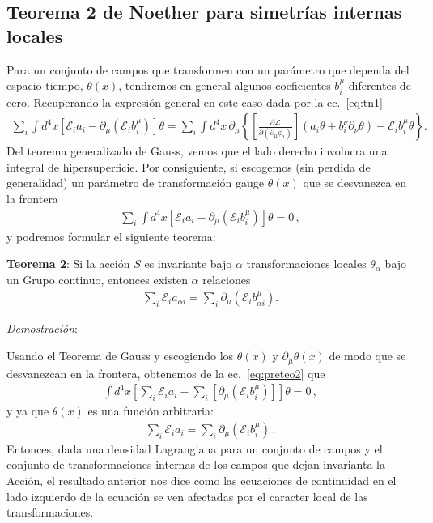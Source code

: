 \subsection{Teorema 2 de Noether para simetrías internas locales}
Para un conjunto de campos que transformen con un parámetro que dependa del espacio tiempo, $\theta(x)$, tendremos en general algunos coeficientes $b_i^{\mu}$ diferentes de cero. Recuperando la expresión general en este caso dada por la ec.~\eqref{eq:tn1}
%
\begin{align}
\sum_i\int {d^4}x \left[ \mathcal{E}_ia_i -  \partial_{\mu}   \left(  \mathcal{E}_i b^{\mu}_i  \right) \right]  \theta   =  \sum_i \int {d^4}x\, \partial_{\mu} \left\{ \left[ \frac{\partial\mathcal{L}}{\partial(\partial_{\mu}\phi_i)}\right] \left( a_i \theta +b^{\nu}_i \partial_{\nu}\theta \right) -\mathcal{E}_i b^{\mu}_i \theta  \right\}.
\end{align}
Del teorema generalizado de Gauss, vemos que el lado derecho involucra una integral de hipersuperficie. 
Por consiguiente, si escogemos (sin perdida de generalidad) un parámetro de transformación gauge $\theta(x)$ que se desvanezca en la frontera
\begin{align}
  \label{eq:preteo2}
\sum_i\int {d^4}x \left[ \mathcal{E}_ia_i -  \partial_{\mu}   \left(  \mathcal{E}_i b^{\mu}_i  \right) \right]  \theta   =0\,,
\end{align}
y podremos formular el siguiente teorema:


\begin{frame}
\textbf{Teorema 2}: Si la acción $S$ es invariante bajo $\alpha$ transformaciones locales $\theta_{\alpha}$ bajo un Grupo  continuo, entonces existen $\alpha$ relaciones
\begin{align}
  \sum_{i}\mathcal{E}_{i} a_{\alpha i}=\sum_{i} \partial_{\mu} \left( \mathcal{E}_{i} b^{\mu}_{\alpha i} \right).
\end{align}
\end{frame}
\emph{Demostración}:

Usando el Teorema de Gauss y escogiendo los $\theta(x)$ y $\partial_{\mu}\theta(x)$ de modo que se desvanezcan en la frontera, obtenemos de la ec.~\eqref{eq:preteo2} que
\begin{align*}
\int {d^4}x \left[    \sum_i  \mathcal{E}_ia_i -\sum_i  \left[ \partial_{\mu}   \left(  \mathcal{E}_i b^{\mu}_i  \right) \right] \right]\theta   =0\,,
\end{align*}
y ya que $\theta(x)$ es una función arbitraria:
\begin{align}
  \sum_i \mathcal{E}_ia_i=\sum_i  \partial_{\mu}   \left(  \mathcal{E}_i b^{\mu}_i  \right) \,.
\end{align}
Entonces, dada una densidad Lagrangiana para un conjunto de campos y el conjunto de transformaciones internas de los campos que dejan invarianta la Acción, el resultado anterior nos dice como las ecuaciones de continuidad en el lado izquierdo de la ecuación se ven afectadas por el caracter local de las transformaciones.

